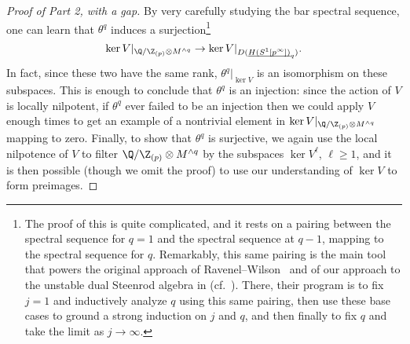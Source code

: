 \begin{proof}[Proof of Part 2, with a gap]
By very carefully studying the bar spectral sequence, one can learn that \(\theta^q\) induces a surjection\footnote{The proof of this is quite complicated, and it rests on a pairing between the spectral sequence for \(q = 1\) and the spectral sequence at \(q - 1\), mapping to the spectral sequence for \(q\).  Remarkably, this same pairing is the main tool that powers the original approach of  Ravenel--Wilson~\cite{RavenelWilsonKthyOfEMSpaces} and of our approach to the unstable dual Steenrod algebra in  (cf.\ ).  There, their program is to fix \(j = 1\) and inductively analyze \(q\) using this same pairing, then use these base cases to ground a strong induction on \(j\) and \(q\), and then finally to fix \(q\) and take the limit as \(j \to \infty\).} \[\ker V|_{\Q / \Z_{(p)} \otimes M^{\wedge q}} \to \ker V|_{D(\OS{H(S^1[p^\infty])}{q})}.\]  In fact, since these two have the same rank, \(\theta^q|_{\ker V}\) is an isomorphism on these subspaces.  This is enough to conclude that \(\theta^q\) is an injection: since the action of \(V\) is locally nilpotent, if \(\theta^q\) ever failed to be an injection then we could apply \(V\) enough times to get an example of a nontrivial element in \(\ker V|_{\Q / \Z_{(p)} \otimes M^{\wedge q}}\) mapping to zero.  Finally, to show that \(\theta^q\) is surjective, we again use the local nilpotence of \(V\) to filter \(\Q / \Z_{(p)} \otimes M^{\sm q}\) by the subspaces \(\ker V^\ell\), \(\ell \ge 1\), and it is then possible (though we omit the proof) to use our understanding of \(\ker V\) to form preimages.
\end{proof}

